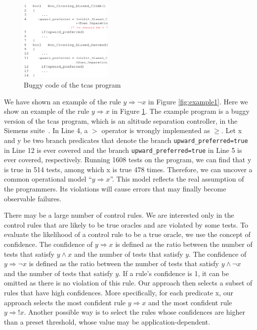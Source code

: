 \documentclass{sig-alternate}
\newcommand{\CodeIn}[1]{{\small\texttt{#1}}}
\begin{document}
\begin{figure}[h]
\begin{center}
  \includegraphics[angle=0,width=0.4\textwidth]{figs/example21.eps}
  \centering
  \caption{Buggy code of the tcas program}
  \label{fig:example2}
\end{center}
\end{figure}


We have shown an example of the rule $y\Rightarrow \neg x$ in Figure
\ref{fig:example1}. Here we show an example of the rule
$y\Rightarrow x$ in Figure \ref{fig:example2}. The example program
is a buggy version of the tcas program, which is an altitude
separation controller, in the Siemens suite~\cite{Hutchins94}. In
Line 4, a $>$ operator is wrongly implemented as $\ge$. Let x and y
be two branch predicates that denote the branch
\CodeIn{upward\_preferred=true} in Line 12 is ever covered and the
branch \CodeIn{upward\_preferred=true} in Line 5 is ever covered,
respectively. Running 1608 tests on the program, we can find that y
is true in 514 tests, among which x is true 478 times. Therefore, we
can uncover a common operational model ``$y\Rightarrow x$''. This
model reflects the real assumption of the programmers. Its
violations will cause errors that may finally become observable
failures.



There may be a large number of control rules. We are interested only
in the control rules that are likely to be true oracles and are
violated by some tests. To evaluate the likelihood of a control rule
to be a true oracle, we use the concept of confidence. The
confidence of $y\Rightarrow x$ is defined as the ratio between the
number of tests that satisfy $y\wedge x$ and the number of tests
that satisfy $y$. The confidence of $y\Rightarrow \neg x$ is defined
as the ratio between the number of tests that satisfy $y\wedge \neg
x$ and the number of tests that satisfy $y$. If a rule's confidence
is 1, it can be omitted as there is no violation of this rule. Our
approach then selects a subset of rules that have high confidences.
More specifically, for each predicate x, our approach selects the
most confident rule $y\Rightarrow x$ and the most confident rule
$y\Rightarrow !x$. Another possible way is to select the rules whose
confidences are higher than a preset threshold, whose value may be
application-dependent.
\end{document}
